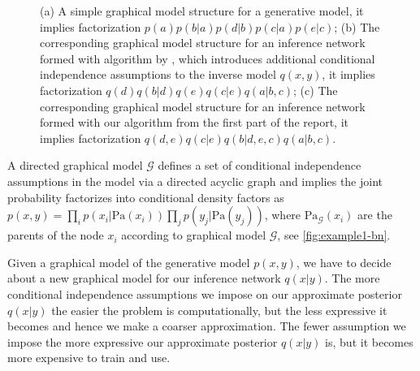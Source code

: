 \documentclass[12pt]{article}
\begin{document}
\begin{figure}[H]
\centering
\begin{subfigure}[b]{0.3\linewidth}
    \centering
    
    \caption{}
    \label{fig:example1-bn}
\end{subfigure}
\begin{subfigure}[b]{0.3\linewidth}
    \centering
    
    \caption{}
    \label{fig:example1-brooks}
\end{subfigure}
\begin{subfigure}[b]{0.3\linewidth}
    \centering
    
    \caption{}
    \label{fig:example1-inverse}
\end{subfigure}
\caption[Simple examples]{
(a) A simple graphical model structure for a generative model, 
it implies factorization $p(a)p(b|a)p(d|b)p(c|a)p(e|c)$; 
(b) The corresponding graphical model structure for an inference network formed with algorithm by \citet{StuhlmullerEtAl2013}, which introduces additional conditional independence assumptions to the inverse model $q(x,y)$, 
it implies factorization $q(d)q(b|d)q(e)q(c|e)q(a|b,c)$;
(c) The corresponding graphical model structure for an inference network formed with our algorithm from the first part of the report, 
it implies factorization $q(d,e)q(c|e)q(b|d,e,c)q(a|b,c)$.
}
\label{fig:example1}
\end{figure}

A directed graphical model $\mathcal{G}$ defines a set of conditional independence assumptions in the model via a directed acyclic graph \cite{KollerFriedman2009}
and implies the joint probability factorizes into conditional density factors as
$p(x,y)=\prod_i p(x_i|\text{Pa}(x_i)) \prod_j p(y_j|\text{Pa}(y_j))$,
where $\text{Pa}_\mathcal{G}(x_i)$ are the parents of the node $x_i$ according to graphical model $\mathcal{G}$, see \autoref{fig:example1-bn}.

Given a graphical model of the generative model $p(x,y)$, 
we have to decide about a new graphical model for our inference network $q(x|y)$. 
The more conditional independence assumptions we impose on our approximate posterior $q(x|y)$ the easier the problem is computationally, but the less expressive it becomes and hence we make a coarser approximation.
The fewer assumption we impose the more expressive our approximate posterior $q(x|y)$ is, but it becomes more expensive to train and use.
\end{document}
